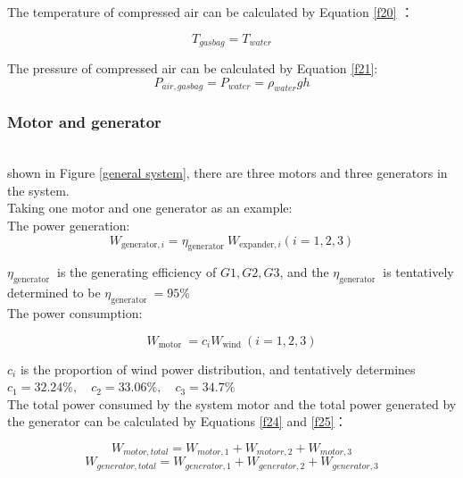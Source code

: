 \documentclass[journal,onecolumn]{IEEEtran}
\begin{document}
The temperature of compressed air can be calculated by Equation \ref{f20} ：

\begin{equation}
	T_{gasbag}=T_{water}
	\label{f20}
\end{equation}

The pressure of compressed air can be calculated by Equation \ref{f21}:
\begin{equation}
	P_{air,gasbag}=P_{water}=\rho_{water}gh
	\label{f21}
\end{equation}

\subsubsection{Motor and generator}
\ \\

 shown in Figure \ref{general system}, there are three motors and three generators in the system.\\

Taking one motor and one generator as an example:\\

The power generation:
\begin{equation}
	W_{\text {generator},i}=\eta_{\text {generator }} W_{\text {expander},i}(i=1,2,3)
	\label{f23}
\end{equation}

$ \eta_{\text {generator }} $ is the generating efficiency of $ G1,G2,G3 $, and the $ \eta_{\text {generator }} $ is tentatively determined to be $ \eta_{\text {generator }} =95\%$\\

The power consumption:

\begin{equation}
	W_{\text {motor }}=c_{i} W_{\text {wind }}(i=1,2,3)
	\label{f22}
\end{equation}



$ c_i  $ is the proportion of wind power distribution, and  tentatively determines $ c_{1}=32.24 \%, \quad c_{2}=33.06 \%, \quad c_{3}=34.7 \% $\\ 



The total power consumed by the system motor and the total power generated by the generator can be calculated by Equations \ref{f24} and \ref{f25}：

\begin{equation}
	W_{motor,total}=W_{motor,1}+W_{motorr,2}+W_{motor,3}
	\label{f24}
\end{equation}
\begin{equation}
	W_{generator,total}=W_{generator,1}+W_{generator,2}+W_{generator,3}
	\label{f25}
\end{equation}
\end{document}
